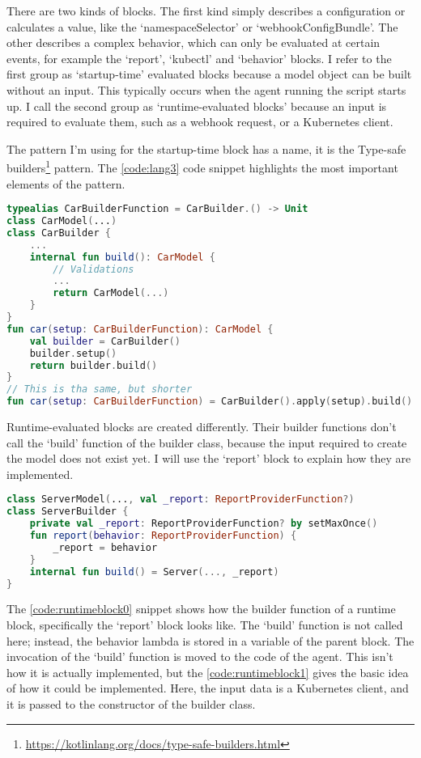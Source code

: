 There are two kinds of blocks. The first kind simply describes a configuration or calculates a value, like the `namespaceSelector' or `webhookConfigBundle'. The other describes a complex behavior, which can only be evaluated at certain events, for example the `report', `kubectl' and `behavior' blocks. I refer to the first group as `startup-time' evaluated blocks because a model object can be built without an input. This typically occurs when the agent running the script starts up. I call the second group as `runtime-evaluated blocks' because an input is required to evaluate them, such as a webhook request, or a Kubernetes client.

The pattern I'm using for the startup-time block has a name, it is the Type-safe builders\footnote{\url{https://kotlinlang.org/docs/type-safe-builders.html}} pattern. The \ref{code:lang3} code snippet highlights the most important elements of the pattern.

\begin{lstlisting}[caption={Type-safe builders example},language=Kotlin,label=code:lang3]
typealias CarBuilderFunction = CarBuilder.() -> Unit
class CarModel(...)
class CarBuilder {
    ...
    internal fun build(): CarModel {
        // Validations
        ...
        return CarModel(...)
    }
}
fun car(setup: CarBuilderFunction): CarModel {
    val builder = CarBuilder()
    builder.setup()
    return builder.build()
}
// This is tha same, but shorter
fun car(setup: CarBuilderFunction) = CarBuilder().apply(setup).build()
\end{lstlisting}

Runtime-evaluated blocks are created differently. Their builder functions don't call the `build' function of the builder class, because the input required to create the model does not exist yet. I will use the `report' block to explain how they are implemented.

\begin{lstlisting}[caption={Builder function of the report block},language=Kotlin,label=code:runtimeblock0]
class ServerModel(..., val _report: ReportProviderFunction?)
class ServerBuilder {
    private val _report: ReportProviderFunction? by setMaxOnce()
    fun report(behavior: ReportProviderFunction) {
        _report = behavior
    }
    internal fun build() = Server(..., _report)
}
\end{lstlisting}

The \ref{code:runtimeblock0} snippet shows how the builder function of a runtime block, specifically the `report' block looks like. The `build' function is not called here; instead, the behavior lambda is stored in a variable of the parent block. The invocation of the `build' function is moved to the code of the agent. This isn't how it is actually implemented, but the \ref{code:runtimeblock1} gives the basic idea of how it could be implemented. Here, the input data is a Kubernetes client, and it is passed to the constructor of the builder class.

